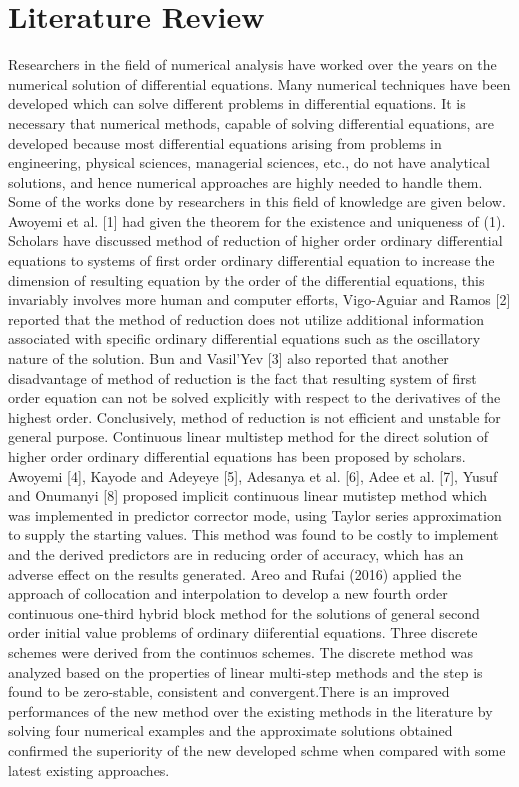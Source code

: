 \documentclass[12pt]{report}
\begin{document}
\chapter{Literature Review}
\noindent Researchers in the field of numerical analysis have worked over the years on the numerical solution of differential equations. Many numerical techniques have been developed which can solve different problems in differential equations. It is necessary that numerical methods, capable of solving differential equations, are developed because most differential equations arising from problems in engineering, physical sciences, managerial sciences, etc., do not have analytical solutions, and hence numerical approaches are highly needed to handle them. Some of the works done by researchers in this field of knowledge are given below.	
 \noindent Awoyemi et al. [1] had given the theorem for the existence and uniqueness of (1). Scholars have discussed method of reduction of higher order ordinary differential equations to systems of first order ordinary differential equation to increase the dimension of resulting equation by the order of the differential equations, this invariably involves more human and computer efforts, Vigo-Aguiar and Ramos [2] reported that the method of reduction does not utilize additional information associated with specific ordinary differential equations such as the oscillatory nature of the solution. Bun and Vasil’Yev [3] also reported that another disadvantage of method of reduction is the fact that resulting system of first order equation can not be solved explicitly with respect to the derivatives of the highest order. Conclusively, method of reduction is not efficient and unstable for general purpose.
\noindent Continuous linear multistep method for the direct solution of higher order ordinary differential equations has been proposed by scholars. Awoyemi [4], Kayode and Adeyeye [5], Adesanya et al. [6], Adee et al. [7], Yusuf and Onumanyi [8] proposed implicit continuous linear mutistep method which was implemented in predictor corrector mode, using Taylor series approximation to supply the starting values. This method was found to be costly to implement and the derived predictors are in reducing order of accuracy, which has an adverse effect on the results generated.
\noindent Areo and Rufai (2016) applied the approach of collocation and interpolation to develop a new fourth order continuous one-third hybrid block method for the solutions of general second order initial value problems of ordinary diiferential equations. Three discrete schemes were derived from the continuos schemes. The discrete method was analyzed based on the properties of linear multi-step methods and the step is found to be zero-stable, consistent and convergent.There is an improved performances of the new method over the existing methods in the literature by solving four numerical examples and the approximate solutions obtained confirmed the superiority of the new developed schme when compared with some latest existing approaches.
\end{document}
